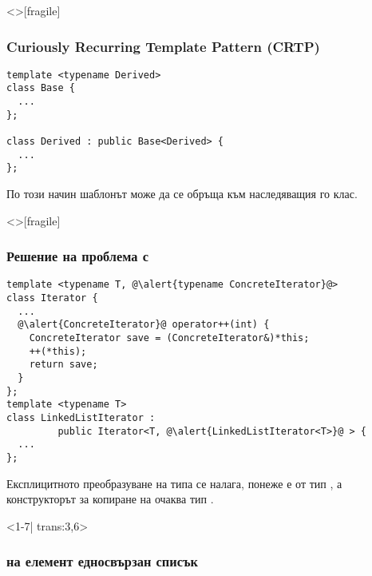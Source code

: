 \documentclass[alsotrans,beameroptions={aspectratio=169}]{beamerswitch}
\begin{document}
\begin{frame}<>[fragile]
  \frametitle{Curiously Recurring Template Pattern (CRTP)}

\begin{lstlisting}
template <typename Derived>
class Base {
  ...
};

class Derived : public Base<Derived> {
  ...
};
\end{lstlisting}
  По този начин шаблонът  може да се обръща към наследяващия го клас.
\end{frame}

\begin{frame}<>[fragile]
  \frametitle{Решение на проблема с }

  \small
\begin{lstlisting}
template <typename T, @\alert{typename ConcreteIterator}@>
class Iterator {
  ...
  @\alert{ConcreteIterator}@ operator++(int) {
    ConcreteIterator save = (ConcreteIterator&)*this;
    ++(*this);
    return save;
  }
};
template <typename T>
class LinkedListIterator :
         public Iterator<T, @\alert{LinkedListIterator<T>}@ > {
  ...
};
\end{lstlisting}
\pause
Експлицитното преобразуване на типа се налага, понеже  е от тип , а конструкторът за копиране на  очаква тип .
\end{frame}

\begin{frame}<1-7| trans:3,6>
  \frametitle{ на елемент  едносвързан списък}

  \begin{center}
  \end{center}
\end{frame}
\end{document}
